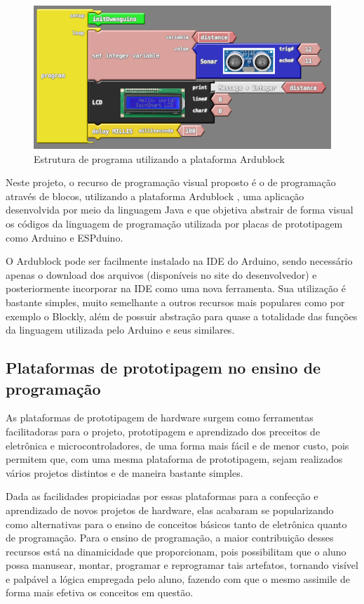 \documentclass[12pt]{article}
\begin{document}
\begin{figure}[!ht]
\centering
\includegraphics[keepaspectratio, width=0.8
\textwidth]{images/ardublock.png}
\caption{Estrutura de programa utilizando a plataforma Ardublock}
\label{fig:arduino}
\end{figure}

    Neste projeto, o recurso de programação visual proposto é o de programação através de blocos, utilizando a plataforma Ardublock \cite{ardublock}, uma aplicação desenvolvida por meio da linguagem Java e que objetiva abstrair de forma visual os códigos da linguagem de programação utilizada por placas de prototipagem como Arduino e ESPduino.
  
    O Ardublock pode ser facilmente instalado na IDE do Arduino, sendo necessário apenas o download dos arquivos (disponíveis no site do desenvolvedor) e posteriormente incorporar na IDE como uma nova ferramenta. Sua utilização é bastante simples, muito semelhante a outros recursos mais populares como por exemplo o Blockly, além de possuir abstração para quase a totalidade das funções da linguagem utilizada pelo Arduino e seus similares. 
    
	\subsection{Plataformas de prototipagem no ensino de programação}
    As plataformas de prototipagem de hardware surgem como ferramentas facilitadoras para o projeto, prototipagem e aprendizado dos preceitos de eletrônica e microcontroladores, de uma forma mais fácil e de menor custo, pois permitem que, com uma mesma plataforma de prototipagem, sejam realizados vários projetos distintos e de maneira bastante simples.
    
    Dada as facilidades propiciadas por essas plataformas para a confecção e aprendizado de novos projetos de hardware, elas acabaram se popularizando como alternativas para o ensino de conceitos básicos tanto de eletrônica quanto de programação. Para o ensino de programação, a maior contribuição desses recursos está na dinamicidade que proporcionam, pois possibilitam que o aluno possa manusear, montar, programar e reprogramar tais artefatos, tornando visível e palpável a lógica empregada pelo aluno, fazendo com que o mesmo assimile de forma mais efetiva os conceitos em questão. 
    
\end{document}
